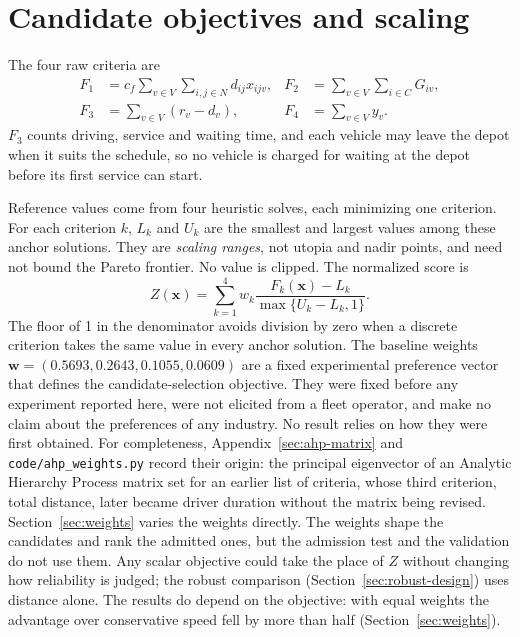 \documentclass[11pt,a4paper]{article}
\begin{document}
\section{Candidate objectives and scaling}\label{sec:objective-scaling}

The four raw criteria are
\begin{align}
 F_1 &= c_f\sum_{v\in V}\sum_{i,j\in N}d_{ij}x_{ijv},
 &F_2 &= \sum_{v\in V}\sum_{i\in C}G_{iv},\\
 F_3 &= \sum_{v\in V}(r_v-d_v),
 &F_4 &= \sum_{v\in V}y_v.                                 \label{eq:criteria}
\end{align}
$F_3$ counts driving, service and waiting time, and each vehicle may
leave the depot when it suits the schedule, so no vehicle is charged for waiting
at the depot before its first service can start.

Reference values come from four heuristic solves, each minimizing one criterion.
For each criterion $k$, $L_k$ and $U_k$ are the smallest and largest values
among these anchor solutions. They are \emph{scaling ranges}, not utopia and
nadir points, and need not bound the Pareto frontier. No value is clipped. The
normalized score is
\begin{equation}
 Z(\mathbf{x})=\sum_{k=1}^{4}w_k\frac{F_k(\mathbf{x})-L_k}{\max\{U_k-L_k,1\}}. \label{eq:objective}
\end{equation}
The floor of 1 in the denominator avoids division by zero when a discrete
criterion takes the same value in every anchor solution. The baseline weights
$\mathbf{w}=(0.5693,0.2643,0.1055,0.0609)$ are a fixed experimental preference
vector that defines the candidate-selection objective. They were fixed before any
experiment reported here, were not elicited from a fleet operator, and make no
claim about the preferences of any industry. No result relies on how they were
first obtained. For completeness, Appendix~\ref{sec:ahp-matrix} and
\texttt{code/ahp\_weights.py} record their origin: the principal eigenvector of
an Analytic Hierarchy Process matrix \cite{saaty1980} set for an earlier list of
criteria, whose third criterion, total distance, later became driver duration
without the matrix being revised. Section~\ref{sec:weights} varies the weights
directly. The weights shape the candidates
and rank the admitted ones, but the admission test and the validation do not use
them. Any scalar objective could take the place of $Z$ without changing how
reliability is judged; the robust comparison (Section~\ref{sec:robust-design})
uses distance alone. The results do depend on the objective: with equal weights
the advantage over conservative speed fell by more than half
(Section~\ref{sec:weights}).
\end{document}
